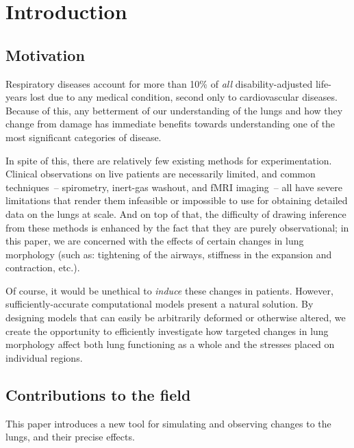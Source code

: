 %
\section{Introduction}

\subsection{Motivation}

Respiratory diseases account for more than 10\% of \textit{all} disability-adjusted life-years lost
due to any medical condition, second only to cardiovascular diseases. ~\cite{GlobalImpact} Because
of this, any betterment of our understanding of the lungs and how they change from damage has
immediate benefits towards understanding one of the most significant categories of disease.

In spite of this, there are relatively few existing methods for experimentation. Clinical
observations on live patients are necessarily limited, and common techniques~-- spirometry,
inert-gas washout, and fMRI imaging~-- all have severe limitations that render them infeasible or
impossible to use for obtaining detailed data on the lungs at scale. And on top of that, the
difficulty of drawing inference from these methods is enhanced by the fact that they are purely
observational; in this paper, we are concerned with the effects of certain changes in lung
morphology (such as: tightening of the airways, stiffness in the expansion and contraction, etc.).

Of course, it would be unethical to \textit{induce} these changes in patients. However,
sufficiently-accurate computational models present a natural solution. By designing models that can
easily be arbitrarily deformed or otherwise altered, we create the opportunity to efficiently
investigate how targeted changes in lung morphology affect both lung functioning as a whole and the
stresses placed on individual regions.


\subsection{Contributions to the field}

This paper introduces a new tool for simulating and observing changes to the lungs, and their
precise effects.

